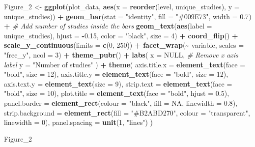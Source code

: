\documentclass[
]{article}
\newenvironment{Shaded}{\begin{snugshade}}{\end{snugshade}}
\newcommand{\AttributeTok}[1]{\textcolor[rgb]{0.13,0.29,0.53}{#1}}
\newcommand{\CommentTok}[1]{\textcolor[rgb]{0.56,0.35,0.01}{\textit{#1}}}
\newcommand{\ConstantTok}[1]{\textcolor[rgb]{0.56,0.35,0.01}{#1}}
\newcommand{\DecValTok}[1]{\textcolor[rgb]{0.00,0.00,0.81}{#1}}
\newcommand{\FloatTok}[1]{\textcolor[rgb]{0.00,0.00,0.81}{#1}}
\newcommand{\FunctionTok}[1]{\textcolor[rgb]{0.13,0.29,0.53}{\textbf{#1}}}
\newcommand{\NormalTok}[1]{#1}
\newcommand{\OtherTok}[1]{\textcolor[rgb]{0.56,0.35,0.01}{#1}}
\newcommand{\SpecialCharTok}[1]{\textcolor[rgb]{0.81,0.36,0.00}{\textbf{#1}}}
\newcommand{\StringTok}[1]{\textcolor[rgb]{0.31,0.60,0.02}{#1}}
\begin{document}
\begin{Shaded}
\begin{Highlighting}[]
\NormalTok{Figure\_2 }\OtherTok{\textless{}{-}} 
  \FunctionTok{ggplot}\NormalTok{(plot\_data, }\FunctionTok{aes}\NormalTok{(}\AttributeTok{x =} \FunctionTok{reorder}\NormalTok{(level, unique\_studies), }\AttributeTok{y =}\NormalTok{ unique\_studies)) }\SpecialCharTok{+}
  \FunctionTok{geom\_bar}\NormalTok{(}\AttributeTok{stat =} \StringTok{"identity"}\NormalTok{, }\AttributeTok{fill =} \StringTok{"\#009E73"}\NormalTok{, }\AttributeTok{width =} \FloatTok{0.7}\NormalTok{) }\SpecialCharTok{+}
  \CommentTok{\# Add number of studies inside the bars}
  \FunctionTok{geom\_text}\NormalTok{(}\FunctionTok{aes}\NormalTok{(}\AttributeTok{label =}\NormalTok{ unique\_studies), }
            \AttributeTok{hjust =} \SpecialCharTok{{-}}\FloatTok{0.15}\NormalTok{, }\AttributeTok{color =} \StringTok{"black"}\NormalTok{, }\AttributeTok{size =} \DecValTok{4}\NormalTok{) }\SpecialCharTok{+}
  \FunctionTok{coord\_flip}\NormalTok{() }\SpecialCharTok{+}
  \FunctionTok{scale\_y\_continuous}\NormalTok{(}\AttributeTok{limits =} \FunctionTok{c}\NormalTok{(}\DecValTok{0}\NormalTok{, }\DecValTok{250}\NormalTok{)) }\SpecialCharTok{+}
  \FunctionTok{facet\_wrap}\NormalTok{(}\SpecialCharTok{\textasciitilde{}}\NormalTok{ variable, }\AttributeTok{scales =} \StringTok{"free\_y"}\NormalTok{, }\AttributeTok{ncol =} \DecValTok{3}\NormalTok{) }\SpecialCharTok{+}
  \FunctionTok{theme\_pubr}\NormalTok{() }\SpecialCharTok{+}
  \FunctionTok{labs}\NormalTok{(}
    \AttributeTok{x =} \ConstantTok{NULL}\NormalTok{,  }\CommentTok{\# Remove x axis label}
    \AttributeTok{y =} \StringTok{"Number of studies"}
\NormalTok{  ) }\SpecialCharTok{+}
  \FunctionTok{theme}\NormalTok{(}
    \AttributeTok{axis.title.x =} \FunctionTok{element\_text}\NormalTok{(}\AttributeTok{face =} \StringTok{"bold"}\NormalTok{, }\AttributeTok{size =} \DecValTok{12}\NormalTok{),}
    \AttributeTok{axis.title.y =} \FunctionTok{element\_text}\NormalTok{(}\AttributeTok{face =} \StringTok{"bold"}\NormalTok{, }\AttributeTok{size =} \DecValTok{12}\NormalTok{),}
    \AttributeTok{axis.text.y =} \FunctionTok{element\_text}\NormalTok{(}\AttributeTok{size =} \DecValTok{9}\NormalTok{),}
    \AttributeTok{strip.text =} \FunctionTok{element\_text}\NormalTok{(}\AttributeTok{face =} \StringTok{"bold"}\NormalTok{, }\AttributeTok{size =} \DecValTok{10}\NormalTok{),}
    \AttributeTok{plot.title =} \FunctionTok{element\_text}\NormalTok{(}\AttributeTok{face =} \StringTok{"bold"}\NormalTok{, }\AttributeTok{hjust =} \FloatTok{0.5}\NormalTok{),}
    \AttributeTok{panel.border =} \FunctionTok{element\_rect}\NormalTok{(}\AttributeTok{colour =} \StringTok{"black"}\NormalTok{, }\AttributeTok{fill =} \ConstantTok{NA}\NormalTok{, }\AttributeTok{linewidth =} \FloatTok{0.8}\NormalTok{),}
    \AttributeTok{strip.background =} \FunctionTok{element\_rect}\NormalTok{(}\AttributeTok{fill =} \StringTok{"\#B2ABD270"}\NormalTok{, }\AttributeTok{colour =} \StringTok{"transparent"}\NormalTok{, }\AttributeTok{linewidth =} \DecValTok{0}\NormalTok{),}
    \AttributeTok{panel.spacing =} \FunctionTok{unit}\NormalTok{(}\DecValTok{1}\NormalTok{, }\StringTok{"lines"}\NormalTok{)}
\NormalTok{  )}

\NormalTok{Figure\_2}
\end{Highlighting}
\end{Shaded}
\end{document}
